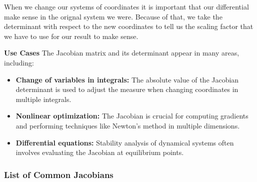 When we change our systems of coordinates it is important
that our differential make sense in the orignal system we were.
Because of that, we take the determinant with respect to the new
coordinates to tell us the scaling factor that we have to use for our
result to make sense.

\textbf{Use Cases}
The Jacobian matrix and its determinant appear in many areas, including:
\begin{itemize}[label=\(-\)]
  \item \textbf{Change of variables in integrals:} The absolute value of the Jacobian determinant is used to adjust the measure when changing coordinates in multiple integrals.
  \item \textbf{Nonlinear optimization:} The Jacobian is crucial for computing gradients and performing techniques like Newton's method in multiple dimensions.
  \item \textbf{Differential equations:} Stability analysis of dynamical systems often involves evaluating the Jacobian at equilibrium points.
\end{itemize}

\subsubsection{List of Common Jacobians}

